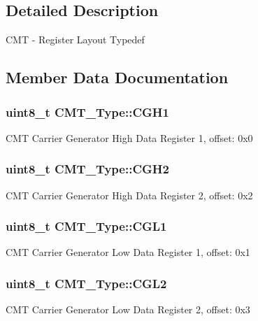 \subsection{Detailed Description}
C\+MT -\/ Register Layout Typedef 

\subsection{Member Data Documentation}
\subsubsection[{\texorpdfstring{C\+G\+H1}{CGH1}}]{ uint8\+\_\+t C\+M\+T\+\_\+\+Type\+::\+C\+G\+H1}\hypertarget{structCMT__Type_ad524e322f0e41a4ffa7c5fb78f097599}{}\label{structCMT__Type_ad524e322f0e41a4ffa7c5fb78f097599}
C\+MT Carrier Generator High Data Register 1, offset\+: 0x0 
\subsubsection[{\texorpdfstring{C\+G\+H2}{CGH2}}]{ uint8\+\_\+t C\+M\+T\+\_\+\+Type\+::\+C\+G\+H2}\hypertarget{structCMT__Type_aa231bd31f31832203a910c65148d6939}{}\label{structCMT__Type_aa231bd31f31832203a910c65148d6939}
C\+MT Carrier Generator High Data Register 2, offset\+: 0x2 
\subsubsection[{\texorpdfstring{C\+G\+L1}{CGL1}}]{ uint8\+\_\+t C\+M\+T\+\_\+\+Type\+::\+C\+G\+L1}\hypertarget{structCMT__Type_abeb8346ceedb3fb02c02cb4c43a0c31d}{}\label{structCMT__Type_abeb8346ceedb3fb02c02cb4c43a0c31d}
C\+MT Carrier Generator Low Data Register 1, offset\+: 0x1 
\subsubsection[{\texorpdfstring{C\+G\+L2}{CGL2}}]{ uint8\+\_\+t C\+M\+T\+\_\+\+Type\+::\+C\+G\+L2}\hypertarget{structCMT__Type_ad5ddf20a0c59f22da1def98165827ae6}{}\label{structCMT__Type_ad5ddf20a0c59f22da1def98165827ae6}
C\+MT Carrier Generator Low Data Register 2, offset\+: 0x3 
